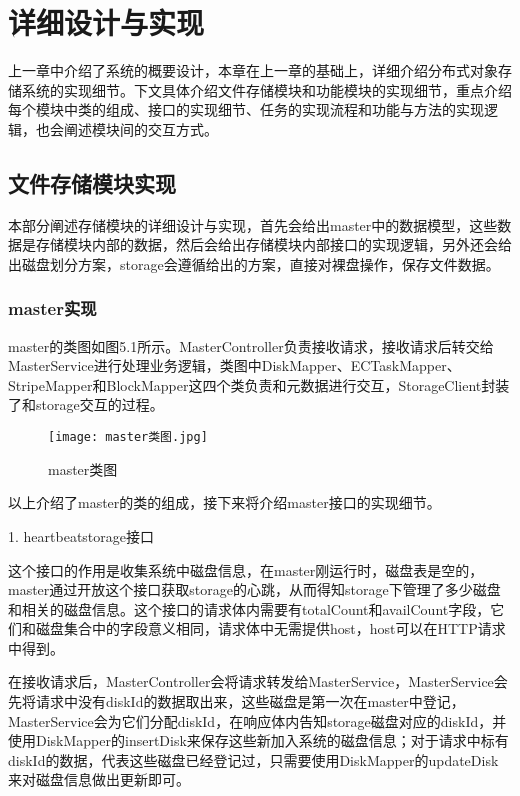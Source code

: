 
\chapter{详细设计与实现}
上一章中介绍了系统的概要设计，本章在上一章的基础上，详细介绍分布式对象存储系统的实现细节。下文具体介绍文件存储模块和功能模块的实现细节，重点介绍每个模块中类的组成、接口的实现细节、任务的实现流程和功能与方法的实现逻辑，也会阐述模块间的交互方式。

\section{文件存储模块实现}%
本部分阐述存储模块的详细设计与实现，首先会给出master中的数据模型，这些数据是存储模块内部的数据，然后会给出存储模块内部接口的实现逻辑，另外还会给出磁盘划分方案，storage会遵循给出的方案，直接对裸盘操作，保存文件数据。

\subsection{master实现}%
master的类图如图5.1所示。MasterController负责接收请求，接收请求后转交给MasterService进行处理业务逻辑，类图中DiskMapper、ECTaskMapper、StripeMapper和BlockMapper这四个类负责和元数据进行交互，StorageClient封装了和storage交互的过程。

\begin{figure}
  \centering
  \texttt{[image: master类图.jpg]}
  \caption{master类图}
\end{figure}

以上介绍了master的类的组成，接下来将介绍master接口的实现细节。

1. heartbeatstorage接口

这个接口的作用是收集系统中磁盘信息，在master刚运行时，磁盘表是空的，master通过开放这个接口获取storage的心跳，从而得知storage下管理了多少磁盘和相关的磁盘信息。这个接口的请求体内需要有totalCount和availCount字段，它们和磁盘集合中的字段意义相同，请求体中无需提供host，host可以在HTTP请求中得到。

在接收请求后，MasterController会将请求转发给MasterService，MasterService会先将请求中没有diskId的数据取出来，这些磁盘是第一次在master中登记，MasterService会为它们分配diskId，在响应体内告知storage磁盘对应的diskId，并使用DiskMapper的insertDisk来保存这些新加入系统的磁盘信息；对于请求中标有diskId的数据，代表这些磁盘已经登记过，只需要使用DiskMapper的updateDisk来对磁盘信息做出更新即可。

